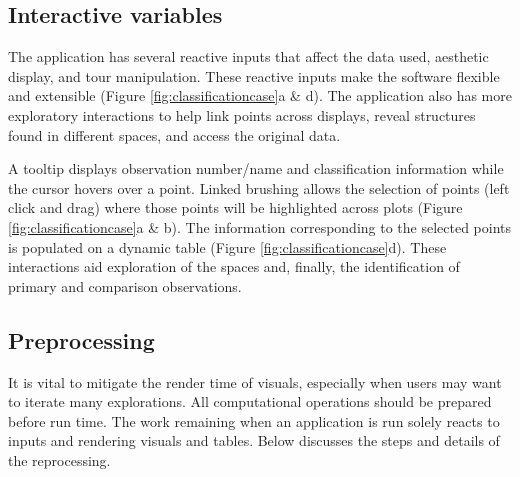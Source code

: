\documentclass[
]{jss}
\begin{document}
\hypertarget{interactive-variables}{%
\subsection{Interactive variables}\label{interactive-variables}}

The application has several reactive inputs that affect the data used,
aesthetic display, and tour manipulation. These reactive inputs make the
software flexible and extensible (Figure \ref{fig:classificationcase}a
\& d). The application also has more exploratory interactions to help
link points across displays, reveal structures found in different
spaces, and access the original data.

A tooltip displays observation number/name and classification
information while the cursor hovers over a point. Linked brushing allows
the selection of points (left click and drag) where those points will be
highlighted across plots (Figure \ref{fig:classificationcase}a \& b).
The information corresponding to the selected points is populated on a
dynamic table (Figure \ref{fig:classificationcase}d). These interactions
aid exploration of the spaces and, finally, the identification of
primary and comparison observations.

\hypertarget{preprocessing}{%
\subsection{Preprocessing}\label{preprocessing}}

It is vital to mitigate the render time of visuals, especially when
users may want to iterate many explorations. All computational
operations should be prepared before run time. The work remaining when
an application is run solely reacts to inputs and rendering visuals and
tables. Below discusses the steps and details of the reprocessing.
\end{document}
